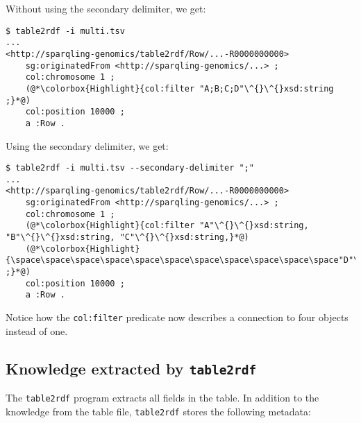   Without using the secondary delimiter, we get:

\begin{siderules}
\begin{lstlisting}
$ table2rdf -i multi.tsv
...
<http://sparqling-genomics/table2rdf/Row/...-R0000000000>
    sg:originatedFrom <http://sparqling-genomics/...> ;
    col:chromosome 1 ;
    (@*\colorbox{Highlight}{col:filter "A;B;C;D"\^{}\^{}xsd:string ;}*@)
    col:position 10000 ;
    a :Row .
\end{lstlisting}
\end{siderules}

  Using the secondary delimiter, we get:

\begin{siderules}
\begin{lstlisting}
$ table2rdf -i multi.tsv --secondary-delimiter ";"
...
<http://sparqling-genomics/table2rdf/Row/...-R0000000000>
    sg:originatedFrom <http://sparqling-genomics/...> ;
    col:chromosome 1 ;
    (@*\colorbox{Highlight}{col:filter "A"\^{}\^{}xsd:string, "B"\^{}\^{}xsd:string, "C"\^{}\^{}xsd:string,}*@)
    (@*\colorbox{Highlight}{\space\space\space\space\space\space\space\space\space\space\space"D"\^{}\^{}xsd:string ;}*@)
    col:position 10000 ;
    a :Row .
\end{lstlisting}
\end{siderules}

  Notice how the \texttt{col:filter} predicate now describes a
  connection to four objects instead of one.

\subsection{Knowledge extracted by \texttt{table2rdf}}

  The \texttt{table2rdf} program extracts all fields in the table.  In addition
  to the knowledge from the table file, \texttt{table2rdf} stores the following
  metadata:

